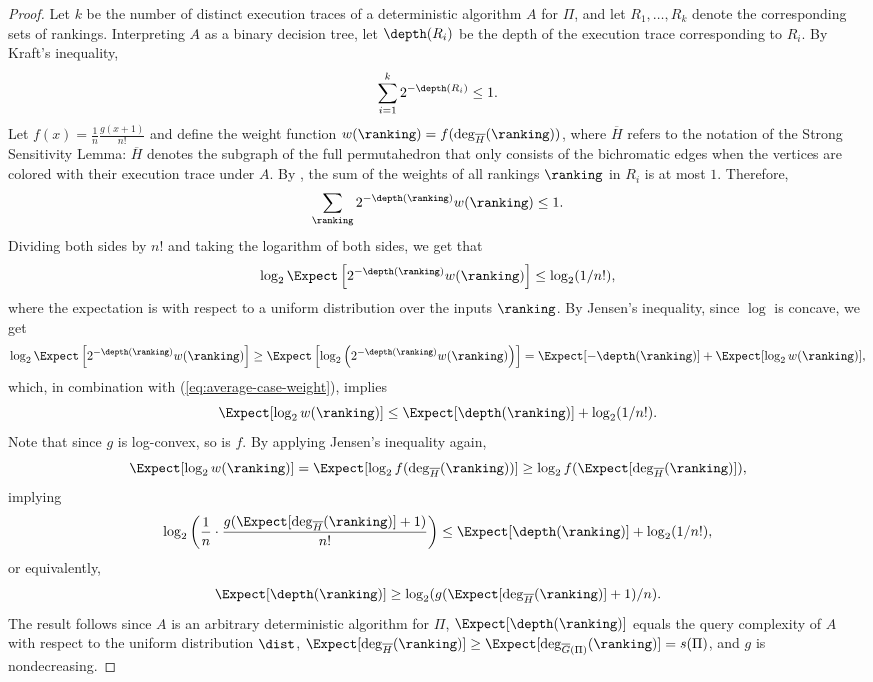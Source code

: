\documentclass{toc}
\begin{document}
\begin{proof}
	Let $k$ be the number of distinct execution traces of a deterministic algorithm $A$ for $\Pi$, and let $R_1,\dots,R_k$ denote the corresponding sets of rankings. Interpreting $A$ as a binary decision tree, let $\depth(R_i)$ be the depth of the execution trace corresponding to $R_i$. By Kraft's inequality,
	\[\sum_{i=1}^{k}2^{-\depth(R_i)}\le 1. \]
	Let $f(x)=\frac{1}{n}\frac{g(x+1)}{n!}$ and define the weight function $w(\ranking)=f(\deg_{\overline{H}}(\ranking))$, where $\overline{H}$ refers to the notation of the Strong Sensitivity Lemma: $\overline{H}$ denotes the subgraph of the full permutahedron that only consists of the bichromatic edges when the vertices are colored with their execution trace under $A$. By , the sum of the weights of all  rankings $\ranking$ in $R_i$ is at most $1$. Therefore,
	\[\sum_{\ranking} 2^{-\depth(\ranking)} w(\ranking) \le 1. \]
	Dividing both sides by $n!$ and taking the logarithm of both sides, we get that
	\begin{equation}
		\label{eq:average-case-weight}
		\log_2 \Expect\left[2^{-\depth(\ranking)}w(\ranking)\right] \le \log_2(1/n!),
	\end{equation}
	where the expectation is with respect to a uniform distribution over the inputs $\ranking$.
	By Jensen's inequality, since $\log$ is concave, we get 
	\[\log_2 \Expect\left[2^{-\depth(\ranking)}w(\ranking)\right] \ge \Expect\left[\log_2 \left(2^{-\depth(\ranking)}w(\ranking) \right)\right]= \Expect[-\depth(\ranking)]+\Expect[\log_2 w(\ranking)], \]
	which, in combination with (\ref{eq:average-case-weight}), implies
	\[\Expect[\log_2 w(\ranking)] \le \Expect[\depth(\ranking)]+\log_2(1/n!). \]
	Note that since $g$ is log-convex, so is $f$. By applying Jensen's inequality again,  
	\[\Expect[\log_2 w(\ranking)]=\Expect[\log_2 f(\deg_{\overline{H}}(\ranking))]\ge \log_2 f(\Expect[\deg_{\overline{H}}(\ranking)]),\]
	implying 
	\[ \log_2\left(\frac{1}{n}\cdot \frac{g(\Expect[\deg_{\overline{H}}(\ranking)]+1)}{n!}\right) \le \Expect[\depth(\ranking)]+\log_2(1/n!), \]
	or equivalently,
	\[ \Expect[\depth(\ranking)] \ge \log_2(g(\Expect[\deg_{\overline{H}}(\ranking)]+1)/n). \]
	The result follows since $A$ is an arbitrary deterministic algorithm for $\Pi$, $\Expect[\depth(\ranking)]$ equals the query complexity of $A$ with respect to the uniform distribution $\dist$, $\Expect[\deg_{\overline{H}}(\ranking)] \ge \Expect[\deg_{\overline{G}(\Pi)}(\ranking)] = s(\Pi)$, and $g$ is nondecreasing. 
\end{proof}
\end{document}
